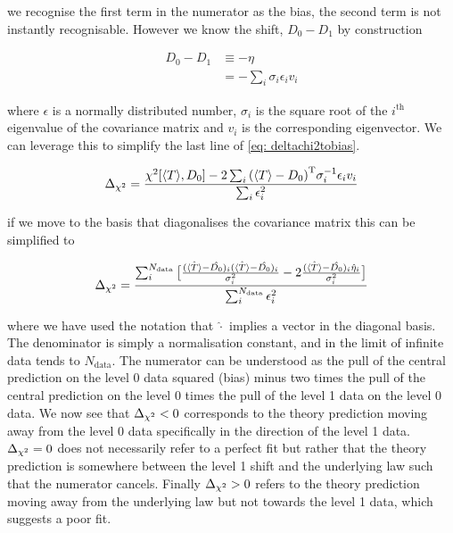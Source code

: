 we recognise the first term in the numerator as the bias, the second term is not
instantly recognisable. However we know the shift, $D_{0} - D_{1}$ by construction

\begin{equation}
    \begin{split}
        D_{0} - D_{1} &\equiv - \eta \\
        &= - \sum_{i} \sigma_{i} \epsilon_{i} v_{i}
    \end{split}
\end{equation}

where $\epsilon$ is a normally distributed number, $\sigma_{i}$ is the square root
of the $i^{\mathrm{th}}$ eigenvalue of the covariance matrix and $v_{i}$ is the
corresponding eigenvector. We can leverage this to simplify the last line of
\eqref{eq: deltachi2tobias}.

\begin{equation}
    \Delta_{\chi^{2}} = \frac{ \chi^{2}[\langle T \rangle, D_{0}] - 2 \sum_{i} {(\langle T \rangle - D_{0})}^{\mathrm{T}} \sigma_{i}^{-1} \epsilon_{i} v_{i} }{ \sum_{i} \epsilon_{i}^{2} }
\end{equation}

if we move to the basis that diagonalises the covariance matrix this can be simplified to

\begin{equation}
    \Delta_{\chi^{2}} = \frac{ \sum_{i}^{N_{\mathrm{data}}} \big[ 
        \frac{(\hat{\langle T \rangle} - \hat{D_{0}})_{i} (\hat{\langle T \rangle} - \hat{D_{0}})_{i}}{\sigma_{i}^{2}} -
        2 \frac{(\hat{\langle T \rangle} - \hat{D_{0}})_{i} \hat{\eta}_{i}}{\sigma_{i}^{2}} \big] }{
            \sum_{i}^{N_{\mathrm{data}}} \epsilon_{i}^{2} }
\end{equation}

where we have used the notation that $\hat{\cdot}$ implies a vector in the
diagonal basis. The denominator is simply a normalisation constant, and in the
limit of infinite data tends to $N_{\mathrm{data}}$. The numerator can be understood
as the pull of the central prediction on the level 0 data squared (bias)
minus two times the pull of the central prediction on the level 0 times the pull
of the level 1 data on the level 0 data. We now see that $\Delta_{\chi^{2}} < 0$ corresponds
to the theory prediction moving away from the level 0 data specifically in the
direction of the level 1 data. $\Delta_{\chi^{2}} = 0$ does not necessarily refer to a perfect
fit but rather that the theory prediction is somewhere between the level 1 shift
and the underlying law such that the numerator cancels. Finally $\Delta_{\chi^{2}} > 0$ refers
to the theory prediction moving away from the underlying law but not towards the
level 1 data, which suggests a poor fit. 

